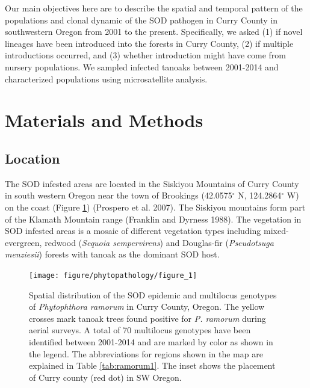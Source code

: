 \documentclass[double,12pt]{beavtex}
\begin{document}
  Our main objectives here are to describe the spatial and temporal
  pattern of the populations and clonal dynamic of the SOD pathogen in
  Curry County in southwestern Oregon from 2001 to the present.
  Specifically, we asked (1) if novel lineages have been introduced into
  the forests in Curry County, (2) if multiple introductions occurred, and
  (3) whether introduction might have come from nursery populations. We
  sampled infected tanoaks between 2001-2014 and characterized populations
  using microsatellite analysis.
  
  \section{Materials and Methods}\label{materials-and-methods}
  
  \subsection{Location}\label{location}
  
  The SOD infested areas are located in the Siskiyou Mountains of Curry
  County in south western Oregon near the town of Brookings
  (42.0575\(^{\circ}\) N, 124.2864\(^{\circ}\) W) on the coast (Figure
  \ref{fig:ramorum1}) (Prospero et al. 2007). The Siskiyou mountains form
  part of the Klamath Mountain range (Franklin and Dyrness 1988). The
  vegetation in SOD infested areas is a mosaic of different vegetation
  types including mixed-evergreen, redwood (\emph{Sequoia sempervirens})
  and Douglas-fir (\emph{Pseudotsuga menziesii}) forests with tanoak as
  the dominant SOD host.
  
  \begin{figure}
  
  {\centering \texttt{[image: figure/phytopathology/figure\_1]} 
  
  }
  
  \caption[Spatial distribution of the SOD epidemic and multilocus genotypes of
  \emph{Phytophthora ramorum} in Curry County, Oregon.]{Spatial distribution of the SOD epidemic and multilocus genotypes of
  \emph{Phytophthora ramorum} in Curry County, Oregon. The yellow crosses
  mark tanoak trees found positive for \emph{P. ramorum} during aerial
  surveys. A total of 70 multilocus genotypes have been identified between
  2001-2014 and are marked by color as shown in the legend. The
  abbreviations for regions shown in the map are explained in Table
  \ref{tab:ramorum1}. The inset shows the placement of Curry county (red
  dot) in SW Oregon.}\label{fig:ramorum1}
  \end{figure}
  
\end{document}
